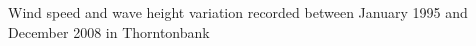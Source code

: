\label{fig:windwave}
Wind speed and wave height variation recorded between January 1995 and December 2008 in Thorntonbank